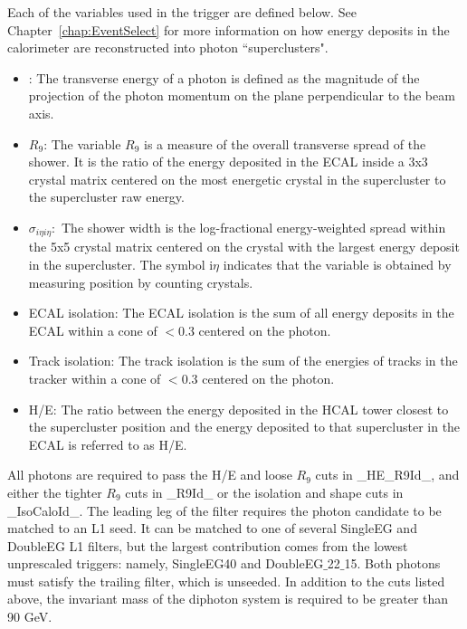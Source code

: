 Each of the variables used in the trigger are defined below. See Chapter~\ref{chap:EventSelect} for more information on how energy deposits in the calorimeter are reconstructed into photon ``superclusters".

\begin{itemize}
\item{\ET:} The transverse energy \ET of a photon is defined
as the magnitude of the projection
of the photon momentum on the plane perpendicular to the beam axis.
\item{$R_9$:} The variable $R_9$ is
a measure of the overall transverse spread of the shower. It is the ratio
of the energy deposited in the ECAL inside a 3x3 crystal matrix centered on
the most energetic crystal in the supercluster to the supercluster
 raw energy.
\item{$\sigma_{i\eta i \eta}:$} The shower width \sigmaietaieta is
      the log-fractional energy-weighted spread within the 5x5 crystal matrix centered on the
      crystal with the largest energy deposit in the supercluster. The symbol
      i$\eta$ indicates that the variable is obtained by measuring position by
      counting crystals.
\item{ECAL isolation:} The ECAL isolation is
      the sum of all energy deposits in the ECAL within a cone of \dR
      $<$0.3 centered on the photon.
\item{Track isolation:} The track isolation is
      the sum of the energies of tracks in the tracker within a cone of \dR
      $<$0.3 centered on the photon.
\item{H/E:} The ratio between the energy deposited in the HCAL
      tower closest to the supercluster position and the energy deposited to
      that supercluster in the ECAL is referred to as H/E.
  \end{itemize}

All photons are required to pass the H/E and loose $R_9$ cuts in
\_HE\_R9Id\_, and either the tighter $R_9$ cuts in
\_R9Id\_ or the isolation and shape cuts in \_IsoCaloId\_.
The leading leg of the filter requires the photon candidate
to be matched to an L1 seed. It can be matched to one of several
SingleEG and DoubleEG L1 filters, but the largest contribution comes
from the lowest unprescaled triggers: namely, SingleEG40 and
DoubleEG$\_$22$\_$15.
Both photons must satisfy the trailing filter, which is unseeded.
In addition to the cuts listed above, the invariant mass of
the diphoton system is required to be greater than 90 GeV.

